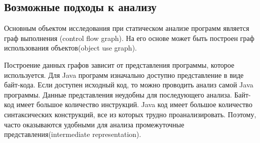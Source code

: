 \subsection{Возможные подходы к анализу}
Основным объектом исследования при статическом анализе программ является граф выполнения (control flow graph). На его основе может быть построен граф использования объектов(object use graph).

Построение данных графов зависит от представления программы, которое используется. Для Java программ изначально 
доступно представление в виде байт-кода. Если доступен исходный код, то можно проводить анализ самой Java программы.
Данные представления неудобны для последующего анализа. Байт-код имеет большое количество инструкций.  Java код имеет большое количество синтаксических конструкций, все из которых трудно проанализировать. Поэтому, часто оказываются удобными для анализа промежуточные представления(intermediate representation).
 

\FloatBarrier

